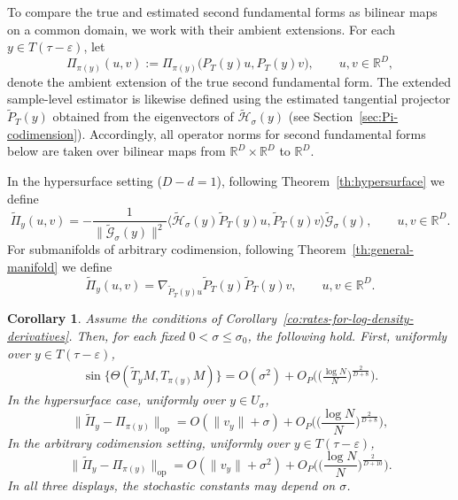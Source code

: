 \documentclass[11pt]{article}
\theoremstyle{plain}
\newtheorem{corollary}[theorem]{Corollary}
\theoremstyle{definition}
\begin{document}
To compare the true and estimated second fundamental forms as bilinear maps on a common domain, we work with their ambient extensions. For each
$y\in T(\tau-\varepsilon)$, let
\[
\Pi_{\pi(y)}(u,v)
:=
\Pi_{\pi(y)}\big(P_T(y)u,P_T(y)v\big),
\qquad u,v\in\mathbb R^D,
\]
denote the ambient extension of the true second fundamental form. 
The extended sample-level estimator is likewise defined using the estimated tangential projector $\widetilde{P}_T(y)$ obtained from the eigenvectors of $\widetilde{\mathcal{H}}_\sigma(y)$ (see Section~\ref{sec:Pi-codimension}). Accordingly, all operator norms for second fundamental forms below are taken over bilinear maps from $\mathbb R^D\times\mathbb R^D$ to $\mathbb R^D$.

In the hypersurface setting ($D-d=1$), following Theorem~\ref{th:hypersurface} we define
\[
\widetilde{\Pi}_y(u,v)
=
-\frac{1}{\|\widetilde{\mathcal G}_\sigma(y)\|^2}
\big\langle
\widetilde{\mathcal H}_\sigma(y)\widetilde P_T(y)u,
\widetilde P_T(y)v
\big\rangle
\widetilde{\mathcal G}_\sigma(y),
\qquad u,v\in\mathbb R^D.
\]
For submanifolds of arbitrary codimension, following Theorem~\ref{th:general-manifold} we define
\[
\widetilde{\Pi}_y(u,v)
=
\nabla_{\widetilde P_T(y)u}\widetilde P_T(y)\widetilde P_T(y)v,
\qquad u,v\in\mathbb R^D.
\]
\begin{corollary}\label{co:final-bound}
Assume the conditions of Corollary~\ref{co:rates-for-log-density-derivatives}. Then, for each fixed $0<\sigma\le\sigma_0$, the following hold. First, uniformly over $y\in T(\tau-\varepsilon)$,
\begin{align}\label{eq:tangent-sample-error}
 \sin\{\Theta(\widetilde{T}_{y}M,T_{\pi(y)}M)\} = O(\sigma^2) +O_P\big(\big(\frac{\log N}{N}\big)^{\frac{2}{D+8}}\big).
\end{align}
In the hypersurface case, uniformly over $y\in U_\sigma$,
\[
\|\widetilde{\Pi}_y-\Pi_{\pi(y)}\|_{\mathrm{op}} = O(\|v_y\|+\sigma) + O_P\big(\big(\frac{\log N}{N}\big)^{\frac{2}{D+8}}\big),
\]
In the arbitrary codimension setting, uniformly over $y\in T(\tau-\varepsilon)$,
\[
\|\widetilde{\Pi}_y-\Pi_{\pi(y)}\|_{\mathrm{op}} = O(\|v_y\|+\sigma^2)+O_P\big(\big(\frac{\log N}{N}\big)^{\frac{2}{D+10}}\big).
\]
In all three displays, the stochastic constants may depend on $\sigma$.
\end{corollary}
\end{document}
